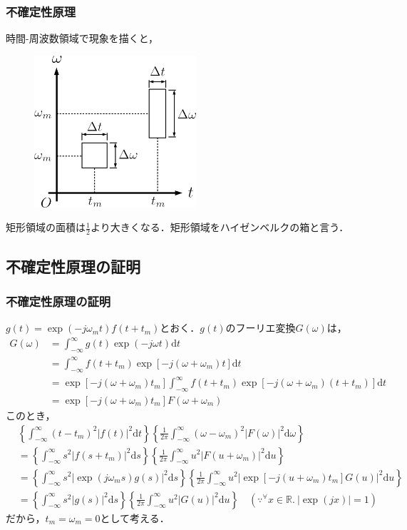 \documentclass[dvipdfmx,graphicx,14pt]{beamer}
\begin{document}
\begin{frame}[c]
    \frametitle{不確定性原理}
    時間-周波数領域で現象を描くと，
    \begin{figure}
        \includegraphics[width=60mm]{./figs/heisenburg_box.png}
    \end{figure}
    矩形領域の面積は$\frac{1}{2}$より大きくなる．矩形領域をハイゼンベルクの箱と言う．
\end{frame}

\subsection{不確定性原理の証明} 

\begin{frame}[c]
    \frametitle{不確定性原理の証明}
    \scriptsize
    $g(t) = \exp(-j\omega_{m}t) f(t + t_{m})$とおく．$g(t)$のフーリエ変換$G(\omega)$は，
    \begin{align*}
        G(\omega) &= \int^{\infty}_{-\infty} g(t) \exp(-j\omega t) \mathrm{d}t \\
        &= \int^{\infty}_{-\infty} f(t + t_{m}) \exp[-j(\omega + \omega_{m}) t] \mathrm{d}t \\
        &= \exp[-j(\omega + \omega_{m}) t_{m}] \int^{\infty}_{-\infty} f(t + t_{m}) \exp[-j(\omega + \omega_{m}) (t + t_{m})] \mathrm{d}t \\
        &= \exp[-j(\omega + \omega_{m}) t_{m}] F(\omega + \omega_{m})
    \end{align*}
    このとき，
    \begin{align*}
        & \left\{ \int_{-\infty}^{\infty} (t - t_{m})^{2} |f(t)|^{2} \mathrm{d}t \right\} \left\{ \frac{1}{2\pi} \int_{-\infty}^{\infty} (\omega - \omega_{m})^{2} |F(\omega)|^{2} \mathrm{d}\omega \right\} \\
        &= \left\{ \int_{-\infty}^{\infty} s^{2} |f(s + t_{m})|^{2} \mathrm{d}s \right\} \left\{ \frac{1}{2\pi} \int_{-\infty}^{\infty} u^{2} |F(u + \omega_{m})|^{2} \mathrm{d}u \right\} \\
        &= \left\{ \int_{-\infty}^{\infty} s^{2} |\exp(j\omega_{m}s)g(s)|^{2} \mathrm{d}s \right\} \left\{ \frac{1}{2\pi} \int_{-\infty}^{\infty} u^{2} |\exp[-j(u+\omega_{m})t_{m}]G(u)|^{2} \mathrm{d}u \right\} \\
        &= \left\{ \int_{-\infty}^{\infty} s^{2} |g(s)|^{2} \mathrm{d}s \right\} \left\{ \frac{1}{2\pi} \int_{-\infty}^{\infty} u^{2} |G(u)|^{2} \mathrm{d}u \right\} \quad (\because {}^{\forall} x \in \mathbb{R}.\ |\exp(jx)| = 1)
    \end{align*}
    だから，$t_{m} = \omega_{m} = 0$として考える．
\end{frame}
\end{document}

